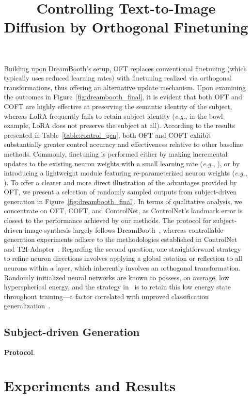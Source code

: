 \title{Controlling Text-to-Image Diffusion by Orthogonal Finetuning}
Building upon DreamBooth’s setup, OFT replaces conventional finetuning (which typically uses reduced learning rates) with finetuning realized via orthogonal transformations, thus offering an alternative update mechanism. Upon examining the outcomes in Figure~\ref{fig:dreambooth_final}, it is evident that both OFT and COFT are highly effective at preserving the semantic identity of the subject, whereas LoRA frequently fails to retain subject identity (\emph{e.g.}, in the bowl example, LoRA does not preserve the subject at all). According to the results presented in Table~\ref{table:control_gen}, both OFT and COFT exhibit substantially greater control accuracy and effectiveness relative to other baseline methods. Commonly, finetuning is performed either by making incremental updates to the existing neuron weights with a small learning rate (\emph{e.g.}, \cite{ruiz2023dreambooth}), or by introducing a lightweight module featuring re-parameterized neuron weights (\emph{e.g.}, \cite{hulora2022,zhang2023adding}). To offer a clearer and more direct illustration of the advantages provided by OFT, we present a selection of randomly sampled outputs from subject-driven generation in Figure~\ref{fig:dreambooth_final}. In terms of qualitative analysis, we concentrate on OFT, COFT, and ControlNet, as ControlNet’s landmark error is closest to the performance achieved by our methods. The protocol for subject-driven image synthesis largely follows DreamBooth~\cite{ruiz2023dreambooth}, whereas controllable generation experiments adhere to the methodologies established in ControlNet~\cite{zhang2023adding} and T2I-Adapter~\cite{mou2023t2i}. Regarding the second question, one straightforward strategy to refine neuron directions involves applying a global rotation or reflection to all neurons within a layer, which inherently involves an orthogonal transformation. Randomly initialized neural networks are known to possess, on average, low hyperspherical energy, and the strategy in~\cite{liu2021orthogonal} is to retain this low energy state throughout training—a factor correlated with improved classification generalization~\cite{liu2018learning,lin2020regularizing}. \subsection{Subject-driven Generation}

\textbf{Protocol}. \section{Experiments and Results}

